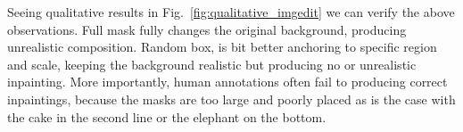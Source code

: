  Seeing qualitative results in Fig.~\ref{fig:qualitative_imgedit} we can verify the above observations. Full mask fully changes the original background, producing unrealistic composition. Random box, is bit better anchoring to specific region and scale, keeping the background realistic but producing no or unrealistic inpainting. More importantly, human annotations often fail to producing correct inpaintings, because the masks are too large and poorly placed as is the case with the cake in the second line or the elephant on the bottom.







